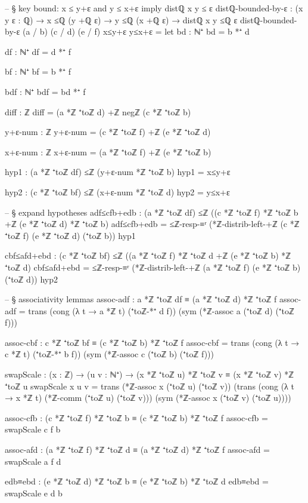 \documentclass[11pt,a4paper]{book}
\begin{document}
\begin{code}
-- § key bound: x ≤ y+ε and y ≤ x+ε imply distℚ x y ≤ ε
distℚ-bounded-by-ε : (x y ε : ℚ) → x ≤ℚ (y +ℚ ε) → y ≤ℚ (x +ℚ ε) → distℚ x y ≤ℚ ε
distℚ-bounded-by-ε (a / b) (c / d) (e / f) x≤y+ε y≤x+ε =
  let
    bd : ℕ⁺
    bd = b *⁺ d

    df : ℕ⁺
    df = d *⁺ f

    bf : ℕ⁺
    bf = b *⁺ f

    bdf : ℕ⁺
    bdf = bd *⁺ f

    diff : ℤ
    diff = (a *ℤ ⁺toℤ d) +ℤ negℤ (c *ℤ ⁺toℤ b)

    y+ε-num : ℤ
    y+ε-num = (c *ℤ ⁺toℤ f) +ℤ (e *ℤ ⁺toℤ d)

    x+ε-num : ℤ
    x+ε-num = (a *ℤ ⁺toℤ f) +ℤ (e *ℤ ⁺toℤ b)

    hyp1 : (a *ℤ ⁺toℤ df) ≤ℤ (y+ε-num *ℤ ⁺toℤ b)
    hyp1 = x≤y+ε

    hyp2 : (c *ℤ ⁺toℤ bf) ≤ℤ (x+ε-num *ℤ ⁺toℤ d)
    hyp2 = y≤x+ε

    -- § expand hypotheses
    adf≤cfb+edb : (a *ℤ ⁺toℤ df) ≤ℤ ((c *ℤ ⁺toℤ f) *ℤ ⁺toℤ b +ℤ (e *ℤ ⁺toℤ d) *ℤ ⁺toℤ b)
    adf≤cfb+edb = ≤ℤ-resp-≡ʳ (*ℤ-distrib-left-+ℤ (c *ℤ ⁺toℤ f) (e *ℤ ⁺toℤ d) (⁺toℤ b)) hyp1

    cbf≤afd+ebd : (c *ℤ ⁺toℤ bf) ≤ℤ ((a *ℤ ⁺toℤ f) *ℤ ⁺toℤ d +ℤ (e *ℤ ⁺toℤ b) *ℤ ⁺toℤ d)
    cbf≤afd+ebd = ≤ℤ-resp-≡ʳ (*ℤ-distrib-left-+ℤ (a *ℤ ⁺toℤ f) (e *ℤ ⁺toℤ b) (⁺toℤ d)) hyp2

    -- § associativity lemmas
    assoc-adf : a *ℤ ⁺toℤ df ≡ (a *ℤ ⁺toℤ d) *ℤ ⁺toℤ f
    assoc-adf = trans (cong (λ t → a *ℤ t) (⁺toℤ-*⁺ d f)) (sym (*ℤ-assoc a (⁺toℤ d) (⁺toℤ f)))

    assoc-cbf : c *ℤ ⁺toℤ bf ≡ (c *ℤ ⁺toℤ b) *ℤ ⁺toℤ f
    assoc-cbf = trans (cong (λ t → c *ℤ t) (⁺toℤ-*⁺ b f)) (sym (*ℤ-assoc c (⁺toℤ b) (⁺toℤ f)))

    swapScale : (x : ℤ) → (u v : ℕ⁺) → (x *ℤ ⁺toℤ u) *ℤ ⁺toℤ v ≡ (x *ℤ ⁺toℤ v) *ℤ ⁺toℤ u
    swapScale x u v =
      trans
        (*ℤ-assoc x (⁺toℤ u) (⁺toℤ v))
        (trans
          (cong (λ t → x *ℤ t) (*ℤ-comm (⁺toℤ u) (⁺toℤ v)))
          (sym (*ℤ-assoc x (⁺toℤ v) (⁺toℤ u))))

    assoc-cfb : (c *ℤ ⁺toℤ f) *ℤ ⁺toℤ b ≡ (c *ℤ ⁺toℤ b) *ℤ ⁺toℤ f
    assoc-cfb = swapScale c f b

    assoc-afd : (a *ℤ ⁺toℤ f) *ℤ ⁺toℤ d ≡ (a *ℤ ⁺toℤ d) *ℤ ⁺toℤ f
    assoc-afd = swapScale a f d

    edb≡ebd : (e *ℤ ⁺toℤ d) *ℤ ⁺toℤ b ≡ (e *ℤ ⁺toℤ b) *ℤ ⁺toℤ d
    edb≡ebd = swapScale e d b


\end{code}
\end{document}
